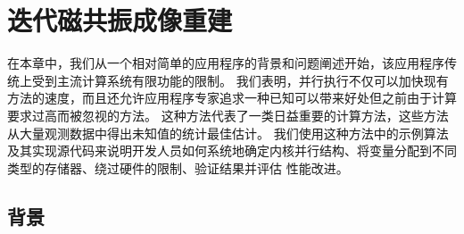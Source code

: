 \section{迭代磁共振成像重建}
在本章中，我们从一个相对简单的应用程序的背景和问题阐述开始，该应用程序传统上受到主流计算系统有限功能的限制。 我们表明，并行执行不仅可以加快现有方法的速度，而且还允许应用程序专家追求一种已知可以带来好处但之前由于计算要求过高而被忽视的方法。 这种方法代表了一类日益重要的计算方法，这些方法从大量观测数据中得出未知值的统计最佳估计。 我们使用这种方法中的示例算法及其实现源代码来说明开发人员如何系统地确定内核并行结构、将变量分配到不同类型的存储器、绕过硬件的限制、验证结果并评估 性能改进。

\subsection{背景}